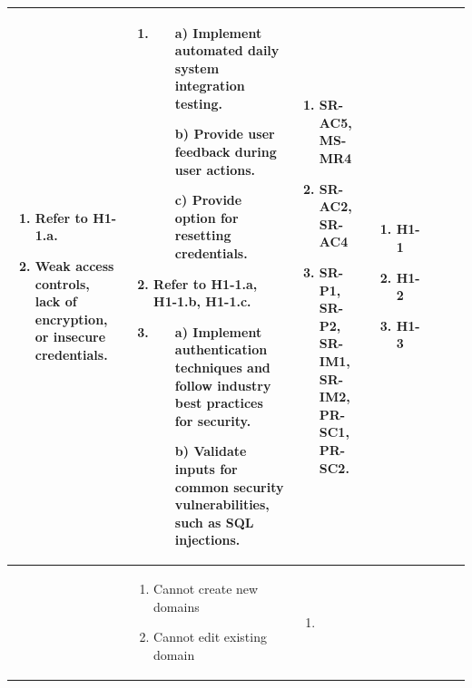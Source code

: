 \documentclass{article}
\begin{document}
\begin{landscape}
\begin{longtable}{|p{2cm}|p{4cm}|p{4cm}|p{4cm}|p{4cm}|p{2cm}|p{2cm}|}
\begin{enumerate}[leftmargin=*]
    \item Refer to H1-1.a.
    \item Weak access controls, lack of encryption, or insecure credentials.
  \end{enumerate} &
  \begin{enumerate}[leftmargin=*]
    \item 
    \begin{enumerate}
        \item[a)] Implement automated daily system integration testing.
        \item[b)] Provide user feedback during user actions.
        \item[c)] Provide option for resetting credentials.
    \end{enumerate}
    \item Refer to H1-1.a, H1-1.b, H1-1.c.
    \item 
    \begin{enumerate}
        \item[a)] Implement authentication techniques and follow industry best practices for security.
        \item[b)] Validate inputs for common security vulnerabilities, such as SQL injections.
    \end{enumerate}
  \end{enumerate} &
  \begin{enumerate}[leftmargin=*]
    \item SR-AC5, MS-MR4
    \item SR-AC2, SR-AC4
    \item SR-P1, SR-P2, SR-IM1, SR-IM2, PR-SC1, PR-SC2.
  \end{enumerate} &
  \begin{enumerate}[leftmargin=*]
    \item H1-1
    \item H1-2
    \item H1-3
  \end{enumerate} \\
  \hline
   & 
  \begin{enumerate}[leftmargin=*]
      \item Cannot create new domains
      \item Cannot edit existing domain
  \end{enumerate} & 
  \begin{enumerate}[leftmargin=*]
    \item

\end{enumerate}
\end{longtable}
\end{landscape}
\end{document}
